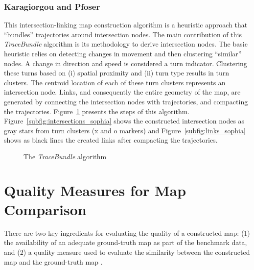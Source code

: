 \documentclass[natbib]{svjour3}                    \smartqed  \usepackage[table]{xcolor}
\begin{document}
\subsubsection{Karagiorgou and Pfoser \protect\cite{Karagiorgou:2012:VTD:2424321.2424334}}
\label{subsub:subsub_kp}
This intersection-linking map construction algorithm is a heuristic approach that ``bundles'' trajectories around intersection nodes. The main contribution of this \emph{TraceBundle} algorithm is its methodology to derive intersection nodes. The basic heuristic relies on detecting changes in movement and then clustering ``similar'' nodes. A change in direction and speed is considered a turn indicator. Clustering these turns based on (i) spatial proximity and (ii) turn type results in turn clusters. The centroid location of each of these turn clusters represents an intersection node. Links, and consequently the entire geometry of the map, are generated by connecting the intersection nodes with trajectories, and compacting the trajectories. Figure~\ref{fig:tracebundle} presents the steps of this algorithm. Figure~\ref{subfig:intersections_sophia} shows the constructed intersection nodes as gray stars from turn clusters (x and o markers) and Figure~\ref{subfig:links_sophia} shows as black lines the created links after compacting the  trajectories. 


\begin{figure}[htbp]
 \begin{center}
 \end{center}
\caption{The \emph{TraceBundle} algorithm \cite{Karagiorgou:2012:VTD:2424321.2424334}}
\label{fig:tracebundle}
\end{figure} 





\section{Quality Measures for Map Comparison}
\label{sec:sec_qmes}

There are two key ingredients for evaluating the quality of a constructed map: (1) the availability of an adequate ground-truth map  as part of the benchmark data, and (2) a quality measure used to evaluate the similarity between the constructed map  and the ground-truth map .
\end{document}
